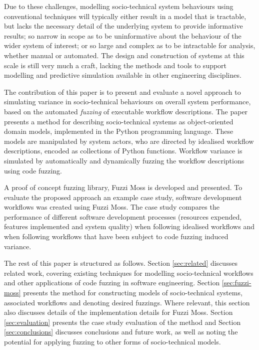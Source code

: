\documentclass{sig-alternate}
\begin{document}
Due to these challenges, modelling socio-technical system behaviours using conventional techniques will typically either
result in a model that is tractable, but lacks the necessary detail of the underlying system to provide informative
results; so narrow in scope as to be uninformative about the behaviour of the wider system of interest; or so large and
complex as to be intractable for analysis, whether manual or automated.  The design and construction of systems at this
scale is still very much a craft, lacking the methods and tools to support modelling and predictive simulation available
in other engineering disciplines.

The contribution of this paper is to present and evaluate a novel approach to simulating variance in socio-technical
behaviours on overall system performance, based on the automated \emph{fuzzing} of executable workflow descriptions.
The paper presents a method for describing socio-technical systems as object-oriented domain models, implemented in the
Python programming language.  These models are manipulated by system actors, who are directed by idealised workflow
descriptions, encoded as collections of Python functions.  Workflow variance is simulated by automatically and
dynamically fuzzing the workflow descriptions using code fuzzing.

A proof of concept fuzzing library, Fuzzi Moss is developed and presented.  To evaluate the proposed approach an example
case study, software development workflows was created using Fuzzi Moss.  The case study compares the performance of
different software development processes (resources expended, features implemented and system quality) when following
idealised workflows and when following workflows that have been subject to code fuzzing induced variance.

The rest of this paper is structured as follows.  Section \ref{sec:related} discusses related work, covering existing
techniques for modelling socio-technical workflows and other applications of code fuzzing in software engineering.
Section \ref{sec:fuzzi-moss} presents the method for constructing models of socio-technical systems, associated
workflows and denoting desired fuzzings.  Where relevant, this section also discusses details of the implementation
details for Fuzzi Moss.  Section \ref{sec:evaluation} presents the case study evaluation of the method and Section
\ref{sec:conclusions} discusses conclusions and future work, as well as noting the potential for applying fuzzing to
other forms of socio-technical models.
\end{document}
